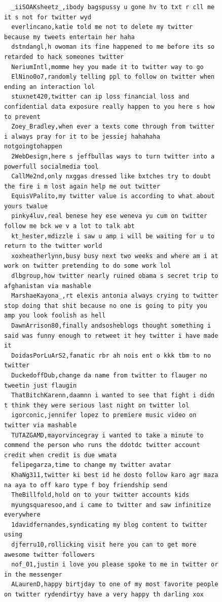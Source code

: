 \begin{figure}[htpb]
\begin{verbatim}
  _iiSOAKsheetz_,ibody bagspussy u gone hv to txt r cll me it s not for twitter wyd
  everlincano,katie told me not to delete my twitter because my tweets entertain her haha
  dstndangl,h owoman its fine happened to me before its so retarded to hack someones twitter
  NeriumIntl,momme hey you made it to twitter way to go
  ElNino0o7,randomly telling ppl to follow on twitter when ending an interaction lol
  stuxnet420,twitter can ip loss financial loss and confidential data exposure really happen to you here s how to prevent
  Zoey_Bradley,when ever a texts come through from twitter i always pray for it to be jessiej hahahaha notgoingtohappen
  2WebDesign,here s jeffbullas ways to turn twitter into a powerfull socialmedia tool
  CallMe2nd,only nxggas dressed like bxtches try to doubt the fire i m lost again help me out twitter
  EquisVPalito,my twitter value is according to what about yours twalue
  pinky4luv,real benese hey ese weneva yu cum on twitter follow me bck we v a lot to talk abt
  kt_hester,mdizzle i saw u amp i will be waiting for u to return to the twitter world
  xoxheatherlynn,busy busy next two weeks and where am i at work on twitter pretending to do some work lol
  dlbgroup,how twitter nearly ruined obama s secret trip to afghanistan via mashable
  MarshaeKayona_,rt elexis antonia always crying to twitter stop doing that shit because no one is going to pity you amp you look foolish as hell
  DawnArrison80,finally andsosheblogs thought something i said was funny enough to retweet it hey twitter i have made it
  DoidasPorLuArS2,fanatic rbr ah nois ent o kkk tbm to no twitter
  DuckedoffDub,change da name from twitter to flauger no tweetin just flaugin
  ThatBitchKarenn,daamnn i wanted to see that fight i didn t think they were serious last night on twitter lol
  igorconic,jennifer lopez to premiere music video on twitter via mashable
  TUTAZGAMD,mayorvincegray i wanted to take a minute to commend the person who runs the ddotdc twitter account credit when credit is due wmata
  felipegarza,time to change my twitter avatar
  KhaNg311,twitter ki best id he dosto follow karo agr maza na aya to off karo type f boy friendship send
  TheBillfold,hold on to your twitter accounts kids
  myungsquaresoo,and i came to twitter and saw infinitize everywhere
  1davidfernandes,syndicating my blog content to twitter using
  djferru10,rollicking visit here you can to get more awesome twitter followers
  nof_01,justin i love you please spoke to me in twitter or in the messenger
  ALaurenD,happy birtjday to one of my most favorite people on twitter rydendirtyy have a very happy th darling xox

\end{verbatim}
\end{figure}
